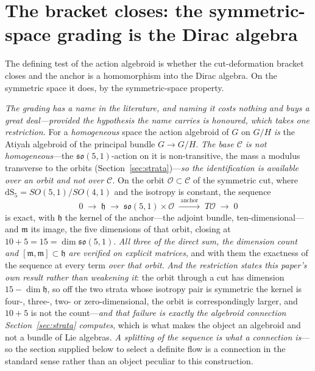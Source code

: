 \documentclass[11pt,a4paper]{article}
\theoremstyle{plain}
\theoremstyle{definition}
\theoremstyle{remark}
\newcommand{\so}{\mathfrak{so}}
\newcommand{\fh}{\mathfrak{h}}
\newcommand{\fm}{\mathfrak{m}}
\newcommand{\C}{\mathcal{C}}
\newcommand{\dS}{\mathrm{dS}}
\begin{document}
\section{The bracket closes: the symmetric-space grading is the Dirac algebra}\label{sec:bracket}

The defining test of the action algebroid is whether the cut-deformation bracket closes and the anchor is a homomorphism into the Dirac algebra. On the symmetric space it does, by the symmetric-space property.

\emph{The grading has a name in the literature, and naming it costs nothing and buys a great deal---provided the hypothesis the name carries is honoured, which takes one restriction.} For a \emph{homogeneous} space the action algebroid of $G$ on $G/H$ \emph{is} the Atiyah algebroid of the principal bundle $G\to G/H$. \emph{The base $\C$ is not homogeneous}---the $\so(5,1)$-action on it is non-transitive, the mass a modulus transverse to the orbits (Section~\ref{sec:strata})---\emph{so the identification is available over an orbit and not over $\C$}. On the orbit $\mathcal{O}\subset\C$ of the symmetric cut, where $\dS_5=SO(5,1)/SO(4,1)$ and the isotropy is constant, the sequence
\begin{equation}\label{eq:atiyah}
0\;\longrightarrow\;\fh\;\longrightarrow\;\so(5,1)\times\mathcal{O}\;\xrightarrow{\;\text{anchor}\;}\;T\mathcal{O}\;\longrightarrow\;0
\end{equation}
is exact, with $\fh$ the kernel of the anchor---the adjoint bundle, ten-dimensional---and $\fm$ its image, the five dimensions of that orbit, closing at $10+5=15=\dim\so(5,1)$. \emph{All three of the direct sum, the dimension count and $[\fm,\fm]\subset\fh$ are verified on explicit matrices}, and with them the exactness of the sequence at every term \emph{over that orbit}. \emph{And the restriction states this paper's own result rather than weakening it}: the orbit through a cut has dimension $15-\dim\fh$, so off the two strata whose isotropy pair is symmetric the kernel is four-, three-, two- or zero-dimensional, the orbit is correspondingly larger, and $10+5$ is not the count---\emph{and that failure is exactly the algebroid connection Section~\ref{sec:strata} computes}, which is what makes the object an algebroid and not a bundle of Lie algebras. \emph{A splitting of the sequence is what a connection is}---so the section supplied below to select a definite flow is a connection in the standard sense rather than an object peculiar to this construction.
\end{document}
